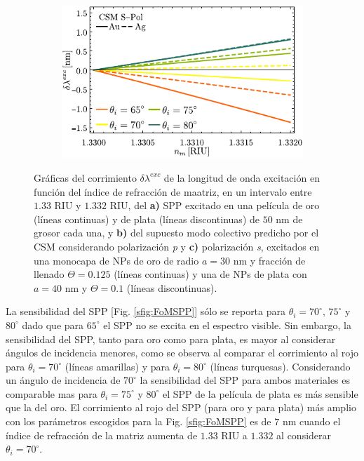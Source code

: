 \begin{figure}[h!]
	\begin{subfigure}{.45\linewidth}\centering
	\includegraphics[scale=1]{2-Resultados/figs/11-SPPCSM/6_Sens_h20_CSMS.pdf}\end{subfigure}\vspace*{-.5em}
	\caption{Gráficas del corrimiento $\delta\lambda^{exc}$ de la longitud de onda excitación  en función del índice de refracción de maatriz, en un intervalo entre $1.33$ RIU y $1.332$ RIU, del \textbf{a)} SPP excitado en una película de oro (líneas continuas) y de plata (líneas discontinuas) de $50$ nm de grosor cada una, y  \textbf{b)} del supuesto modo colectivo predicho por el CSM considerando polarización \emph{p} y \textbf{c)}  polarización \emph{s}, excitados en una monocapa de NPs de oro de radio $a=30$ nm y fracción de llenado $\Theta=0.125$ (líneas continuas) y una de NPs de plata con $a=40$ nm y $\Theta=0.1$ (líneas discontinuas).}\label{fig:FoMSPPCSM}
	\end{figure}	

La sensibilidad del SPP [Fig. \ref{sfig:FoMSPP}] sólo se reporta para $\theta_i=70^\circ,\, 75^\circ$ y $80^\circ$ dado que para $65^\circ$ el SPP no se excita en el espectro visible. Sin embargo, la sensibilidad del SPP, tanto para oro como para plata, es mayor al considerar ángulos de incidencia  menores, como se observa al comparar el corrimiento al rojo para $\theta_i=70^\circ$ (líneas amarillas) y  para $\theta_i=80^\circ$ (líneas turquesas).  Considerando un ángulo de incidencia de $70^\circ$ la sensibilidad del SPP para ambos materiales es comparable mas para $\theta_i=75^\circ$ y $80^\circ$ el SPP de la película de plata es más sensible que la del oro. El corrimiento al rojo del SPP (para oro y para plata) más amplio con los parámetros escogidos para la Fig. \ref{sfig:FoMSPP} es de $7$ nm cuando el índice de refracción de la matriz  aumenta de $1.33$ RIU a $1.332$ al considerar $\theta_i=70^\circ$.

